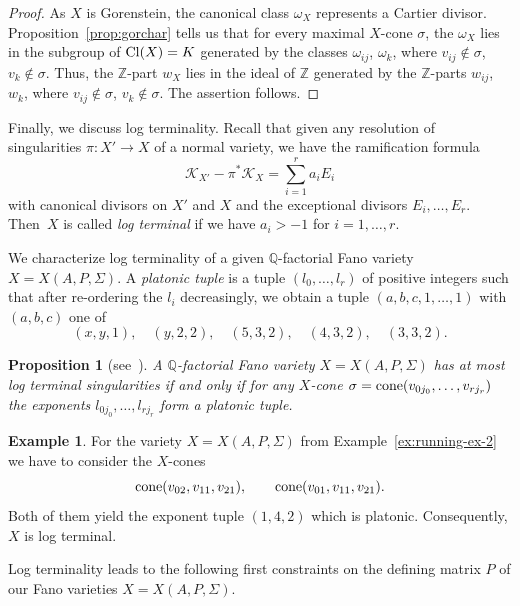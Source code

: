 \documentclass[pdftex]{sigma}%
\newtheorem{prop}[thm]{Proposition}
\theoremstyle{definition}
\newtheorem{exam}[thm]{Example}
\def\Cl{{\rm Cl}}
\def\ZZ{{\mathbb Z}}
\def\QQ{{\mathbb Q}}
\def\cone{{\rm cone}}
\numberwithin{equation}{section}
\begin{document}
\begin{proof}
As $X$ is Gorenstein, the canonical class $\omega_X$
represents a Cartier divisor.
Proposition~\ref{prop:gorchar} tells us that for
every maximal $X$-cone $\sigma$,
the $\omega_X$ lies in the subgroup of $\Cl(X) =K$
generated by the classes
$\omega_{ij}$, $\omega_k$, where $v_{ij} \not\in \sigma$,
$v_k \not\in \sigma$.
Thus, the $\ZZ$-part $w_X$ lies in the ideal of $\ZZ$
generated by the $\ZZ$-parts $w_{ij}$, $w_k$,
where $v_{ij} \not\in \sigma$, $v_k \not\in \sigma$.
The assertion follows.
\end{proof}


Finally, we discuss log terminality.
Recall that given any resolution of
singularities $\pi \colon X' \to X$ of a normal
variety, we have the ramification
formula
\[
\mathcal{K}_{X'} - \pi^*\mathcal{K}_{X}
 =
\sum_{i=1}^r a_i E_i
\]
with canonical divisors on $X'$
and $X$ and the exceptional divisors
$E_i, \dots, E_r$.
Then~$X$ is called \emph{log terminal} if
we have $a_i > -1$ for $i = 1, \dots, r$.

We characterize log terminality of a given
$\QQ$-factorial Fano variety $X = X(A,P,\Sigma)$.
A \emph{platonic tuple} is a tuple
$(l_0,\dots,l_r)$ of positive integers
such that after re-ordering
the $l_i$ decreasingly, we obtain a tuple
$(a,b,c,1, \dots, 1)$ with $(a,b,c)$ one of
\[
(x,y,1),
\quad
(y,2,2),
\quad
(5,3,2),
\quad
(4,3,2),
\quad
(3,3,2).
\]


\begin{prop}[{see~\cite[Theorem~3.13]{ArBrHaWr}}]
\label{rem:platonictuples}
A $\QQ$-factorial Fano variety $X = X(A,P,\Sigma)$
has at most log terminal
singularities if and only if
for any $X$-cone
$\sigma = \cone(v_{0j_0}, \dots, v_{rj_r})$
the exponents $l_{0j_0}, \dots, l_{rj_r}$
form a platonic tuple.
\end{prop}

\begin{exam}
For the variety $X = X(A,P,\Sigma)$
from Example~\ref{ex:running-ex-2}
we have to consider the $X$-cones
\[
\cone(v_{02},v_{11},v_{21}),
\qquad
\cone(v_{01},v_{11},v_{21}).
\]
Both of them yield the exponent
tuple $(1,4,2)$ which is platonic.
Consequently, $X$ is log terminal.
\end{exam}

Log terminality leads to the following first
constraints on the defining matrix $P$ of our
Fano varieties $X = X(A,P,\Sigma)$.
\end{document}

